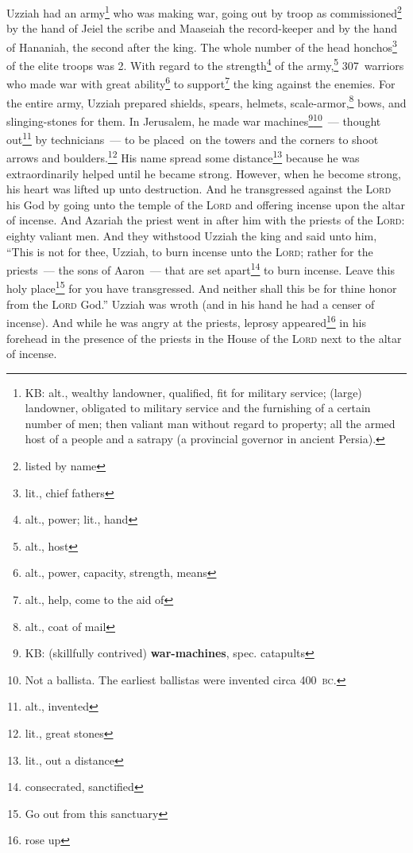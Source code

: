 \begin{inparaenum}
     Uzziah had an army\footnote{KB: alt., wealthy landowner, qualified, fit for military service; (large) landowner, obligated to military service and the furnishing of a certain number of men; then valiant man without regard to property; all the armed host of a people and a satrapy (a provincial governor in ancient Persia).} who was making war, going out by troop as commissioned\footnote{listed by name} by the hand of Jeiel the scribe and Maaseiah the record-keeper and by the hand of Hananiah, the second after the king.%
     The whole number of the head honchos\footnote{lit., chief fathers} of the elite troops was 2.%
     With regard to the strength\footnote{alt., power; lit., hand} of the army,\footnote{alt., host} 307~warriors who made war with great ability\footnote{alt., power, capacity, strength, means} to support\footnote{alt., help, come to the aid of} the king against the enemies.%
     For the entire army, Uzziah prepared shields, spears, helmets, scale-armor,\footnote{alt., coat of mail} bows, and slinging-stones for them.%
     In Jerusalem, he made war machines\footnote{KB: (skillfully contrived) \textbf{war-machines}, spec. catapults}\footnote{Not a ballista. The earliest ballistas were invented circa 400~\textsc{bc}.}~--- thought out\footnote{alt., invented} by technicians~--- to be placed\understood\ on the towers and the corners to shoot arrows and boulders.\footnote{lit., great stones} His name spread some distance\footnote{lit., out a distance} because he was extraordinarily helped  until he became strong.%
     However, when he become strong, his heart was lifted up unto destruction. And he transgressed against the \textsc{Lord} his God by going unto the temple of the \textsc{Lord} and offering incense upon the altar of incense.%
     And Azariah the priest went in after him with the priests of the \textsc{Lord}: eighty valiant men.%
     And they withstood Uzziah the king and said unto him, ``This is not for thee, Uzziah, to burn incense unto the \textsc{Lord}; rather for the priests~--- the sons of Aaron~--- that are set apart\footnote{consecrated, sanctified} to burn incense. Leave this holy place\footnote{Go out from this sanctuary} for you have transgressed. And neither shall this be for thine honor from the \textsc{Lord} God.''%
     Uzziah was wroth (and in his hand he had a censer of incense). And while he was angry at the priests, leprosy appeared\footnote{rose up} in his forehead in the presence of the priests in the House of the \textsc{Lord} next to the altar of incense.%

\end{inparaenum}
